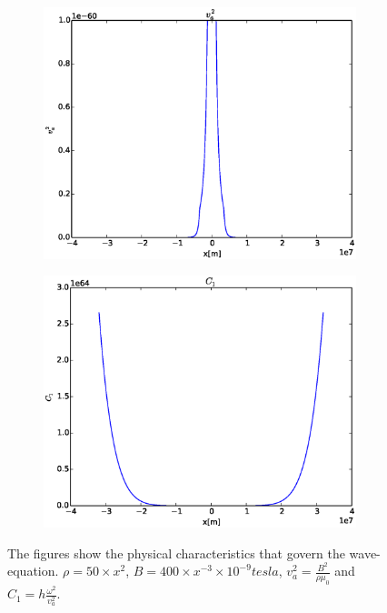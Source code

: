 \documentclass[x11names]{article}
\begin{document}
\begin{figure}
\begin{subfigure}{0.45\linewidth}
    \end{subfigure}
     \begin{subfigure}{0.45\linewidth}
      \includegraphics[width = \textwidth]{figures/va2}
    \end{subfigure}
    \begin{subfigure}{0.45\linewidth}
      \includegraphics[width = \textwidth]{figures/C1}
    \end{subfigure}
    \caption{The figures show the physical characteristics that govern the wave-equation. \(\rho = 50\times x^{2}\), \(B = 400\times x^{-3} \times 10^{-9}\si{tesla}\), \(v_a^2 = \frac{B^2}{\rho \mu_0}\) and \(C_1 = h \frac{\omega^2}{v_a^2}\).}
  \label{eq:va2}
  \end{figure}
\end{document}
